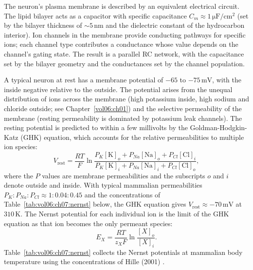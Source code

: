 

 The neuron's plasma membrane is
described by an equivalent electrical circuit. The lipid bilayer acts
as a capacitor with specific capacitance $C_m \approx 1\,\si{\micro\farad}/
\text{cm}^2$ (set by the bilayer thickness of $\sim 5\,\text{nm}$ and
the dielectric constant of the hydrocarbon interior). Ion channels in
the membrane provide conducting pathways for specific ions; each
channel type contributes a conductance whose value depends on the
channel's gating state. The result is a parallel RC network, with the
capacitance set by the bilayer geometry and the conductances set by
the channel population.

 A typical neuron at rest has a membrane
potential of $-65$ to $-75\,\text{mV}$, with the inside negative
relative to the outside. The potential arises from the unequal
distribution of ions across the membrane (high potassium inside,
high sodium and chloride outside; see Chapter~\ref{vol06:ch01}) and
the selective permeability of the membrane (resting permeability is
dominated by potassium leak channels). The resting potential is
predicted to within a few millivolts by the Goldman-Hodgkin-Katz (GHK)
equation, which accounts for the relative permeabilities to multiple
ion species:
\begin{equation}
V_{\text{rest}} = \frac{RT}{F} \ln \frac{P_K[\text{K}]_o + P_{Na}[\text{Na}]_o + P_{Cl}[\text{Cl}]_i}{P_K[\text{K}]_i + P_{Na}[\text{Na}]_i + P_{Cl}[\text{Cl}]_o},
\label{eq:ghk}
\end{equation}
where the $P$ values are membrane permeabilities and the subscripts
$o$ and $i$ denote outside and inside. With typical mammalian
permeabilities $P_K : P_{Na} : P_{Cl} \approx 1 : 0.04 : 0.45$ and
the concentrations of Table~\ref{tab:vol06:ch07:nernst} below, the
GHK equation gives $V_{\text{rest}} \approx -70\,\text{mV}$ at
$310\,\si{\kelvin}$. The Nernst potential for each individual ion is
the limit of the GHK equation as that ion becomes the only permeant
species:
\begin{equation}
E_X = \frac{RT}{z_X F} \ln \frac{[X]_o}{[X]_i}.
\label{eq:nernst}
\end{equation}
Table~\ref{tab:vol06:ch07:nernst} collects the Nernst potentials at
mammalian body temperature using the concentrations of Hille
(2001) \cite[table 1.1]{text:v6c07-hille-2001}.

